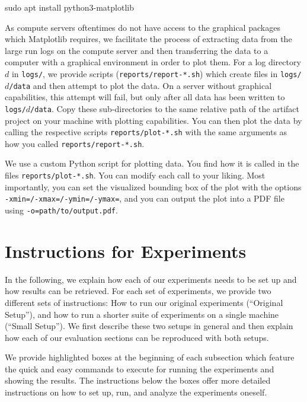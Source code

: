 \documentclass[runningheads]{article}
\numberwithin{dummy}{subsection}
\begin{document}
\begin{ttfenv}
sudo apt install python3-matplotlib
\end{ttfenv}

As compute servers oftentimes do not have access to the graphical packages which Matplotlib requires, we facilitate the process of extracting data from the large run logs on the compute server and then transferring the data to a computer with a graphical environment in order to plot them.
For a log directory $d$ in \texttt{logs/}, we provide scripts (\texttt{reports/report-*.sh}) which create files in \texttt{logs/$d$/data} and then attempt to plot the data.
On a server without graphical capabilities, this attempt will fail, but only after all data has been written to \texttt{logs/$d$/data}.
Copy these sub-directories to the same relative path of the artifact project on your machine with plotting capabilities.
You can then plot the data by calling the respective scripts \texttt{reports/plot-*.sh} with the same arguments as how you called \texttt{reports/report-*.sh}.

We use a custom Python script for plotting data.
You find how it is called in the files \texttt{reports/plot-*.sh}.
You can modify each call to your liking.
Most importantly, you can set the visualized bounding box of the plot with the options \texttt{-xmin=/-xmax=/-ymin=/-ymax=}, and you can output the plot into a PDF file using \texttt{-o=path/to/output.pdf}.














\section{Instructions for Experiments}

In the following, we explain how each of our experiments needs to be set up and how results can be retrieved.
For each set of experiments, we provide two different sets of instructions: How to run our original experiments (``Original Setup''), and how to run a shorter suite of experiments on a single machine (``Small Setup'').
We first describe these two setups in general and then explain how each of our evaluation sections can be reproduced with both setups.

We provide highlighted boxes at the beginning of each subsection which feature the quick and easy commands to execute for running the experiments and showing the results.
The instructions below the boxes offer more detailed instructions on how to set up, run, and analyze the experiments oneself.
\end{document}
